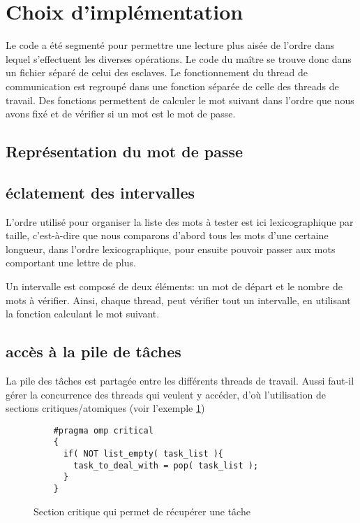 \section{Choix d'implémentation} %
\label{sec:impl}

Le code a été segmenté pour permettre une lecture plus aisée de l'ordre dans lequel s'effectuent les diverses opérations. Le code du maître se trouve donc dans un fichier séparé de celui des esclaves. Le fonctionnement du thread de communication est regroupé dans une fonction séparée de celle des threads de travail. Des fonctions permettent de calculer le mot suivant dans l'ordre que nous avons fixé et de vérifier si un mot est le mot de passe. 

\subsection{Représentation du mot de passe}


\subsection{éclatement des intervalles}

L'ordre utilisé pour organiser la liste des mots à tester est ici lexicographique par taille, c'est-à-dire que nous comparons d'abord tous les mots d'une certaine longueur, dans l'ordre lexicographique, pour ensuite pouvoir passer aux mots comportant une lettre de plus.

Un intervalle est composé de deux éléments: un mot de départ et le nombre de mots à vérifier. Ainsi, chaque thread, peut vérifier tout un intervalle, en utilisant la fonction calculant le mot suivant.

\subsection{accès à la pile de tâches}

La pile des tâches est partagée entre les différents threads de travail. Aussi faut-il gérer la concurrence des threads qui veulent y accéder, d'où l'utilisation de sections critiques/atomiques (voir l'exemple \ref{critical})

\begin{figure}
\begin{lstlisting}
	#pragma omp critical
	{
	  if( NOT list_empty( task_list ){
	    task_to_deal_with = pop( task_list );
	  }
	}
\end{lstlisting}
\caption{Section critique qui permet de récupérer une tâche}
\label{critical}
\end{figure}